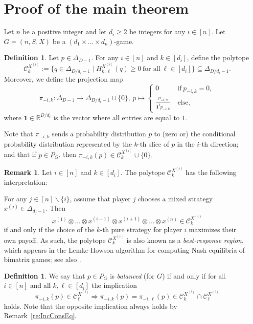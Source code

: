 \documentclass[11pt]{amsart}
\theoremstyle{definition}
\newtheorem{remark}[theorem]{Remark}
\newtheorem{definition}[theorem]{Definition}
\numberwithin{subcase}{case}
\newcommand{\RR}{{\mathbb R}}
\begin{document}
\section{Proof of the main theorem}
Let $n$ be a positive integer and let $d_i \geq 2$ be integers for any
$i \in [n]$. Let $G=(n,S,X)$ be a $(d_1\times \dots \times
d_n)$-game. 

\begin{definition}
Let $p \in \Delta_{D -1}$. For any $i \in [n]$ and $k \in [d_i]$,
define the polytope \[ \mathcal{C}^{X^{(i)}}_k:=  \{ q \in
\Delta_{D/d_i-1} \mid  H^{X^{(i)}}_{k,\ell}(q)  \geq 0 \ \text{for all} \ \ell \in [d_i] \} \subseteq \Delta_{D/d_i-1}. \]   Moreover, we define the projection map \[ \pi_{-i,k}: \Delta_{D -1}  \to  \Delta_{D/d_i-1} \cup \{0\}, \ p \mapsto \begin{cases}
    0 & \ \text{if} \ p_{-i,k}=0, \\
     \frac{p_{-i,k}}{\mathbf{1}^t p_{-i,k} } & \ \text{else}, 
\end{cases}   \] where $\mathbf{1} \in \RR^{D/d_i}$ is the vector where all entries are equal to $1$. 
\end{definition}

Note that $\pi_{-i,k}$ sends a probability distribution $p$ to (zero
or) the conditional probability distribution represented by the $k$-th
slice of $p$ in the $i$-th direction; and that if $p \in P_G$, then
$\pi_{-i,k}(p) \in \mathcal{C}^{X^{(i)}}_k \cup \{0\}.$ 


\begin{remark}
Let $i \in [n]$ and $k \in [d_i]$. The polytope $\mathcal{C}^{X^{(i)}}_k$ has the following interpretation:

\noindent For any $j \in [n] \backslash \{i\}$, assume that player $j$ chooses a mixed strategy $x^{(j)} \in \Delta_{d_j-1}$. Then \[ x^{(1)} \otimes \dots 
\otimes x^{(i-1)} \otimes x^{(i+1)} \otimes \dots \otimes x^{(n)} \in \mathcal{C}^{X^{(i)}}_k \] if and only if the choice of the $k$-th pure strategy for player $i$ maximizes their own payoff. As such, the polytope $\mathcal{C}^{X^{(i)}}_k$ is also known as a \textit{best-response region}, which appears in the Lemke-Howson algorithm for computing Nash equilibria of bimatrix games; see also \cite{FindingNashEquilibria}.
\end{remark}


\begin{definition}
We say that $p \in P_G$ is \textit{balanced} (for $G$) if and only if
for all $i \in [n]$ and all $k, \ell \in [d_i]$ the implication 
\[ \pi_{-i,k}(p) \in \mathcal{C}^{X^{(i)}}_{\ell} \Rightarrow \pi_{-i,k}(p)=\pi_{-i,\ell}(p) \in \mathcal{C}^{X^{(i)}}_{k} \cap \mathcal{C}^{X^{(i)}}_{\ell}  \]     
holds. Note that the opposite implication always holds by
Remark~\ref{re:IncConsEq}.
\end{definition}
\end{document}
